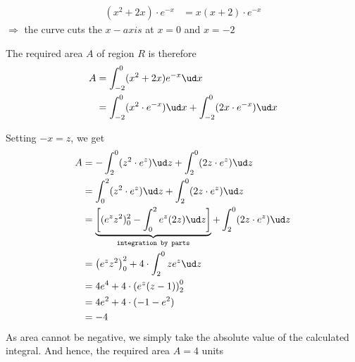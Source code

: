 \begin{solution}[\fullpage]
 \begin{align}
    (x^2+2x)\cdot e^{-x} &= x(x+2)\cdot e^{-x}
 \end{align}
 $\Rightarrow$ the curve cuts the $x-axis$ at $x=0$ and $x=-2$
 
 The required area $A$ of region $R$ is therefore
 \begin{align}
    A &= \int_{-2}^0(x^2+2x)e^{-x}\ud x \\
      &= \int_{-2}^0 (x^2\cdot e^{-x})\ud x + \int_{-2}^0 (2x\cdot e^{-x})\ud x
  \end{align}
  
  Setting $-x = z$, we get 
  \begin{align}
    A &= -\int_2^0(z^2\cdot e^z)\ud z + \int_2^0 (2z\cdot e^z)\ud z \\
      &= \int_0^2(z^2\cdot e^z)\ud z + \int_2^0 (2z\cdot e^z)\ud z \\
      &= \underbrace{\left[ (e^{z}z^2)_0^2 - \int_0^2 e^{z}(2z)\ud z \right]}_{\texttt{integration by parts}}
      + \int_2^0 (2z\cdot e^z)\ud z \\
      &= \left( e^{z}z^2 \right)_0^2 + 4\cdot\int_2^0 ze^{z}\ud z \\
      &= 4e^4 + 4\cdot\left( e^{z}(z-1)\right)_2^0 \\
      &= 4e^2 + 4\cdot(-1-e^2) \\
      &= -4
 \end{align}
 As area cannot be negative, we simply take the absolute value of the calculated integral.
 And hence, the required area $A = 4$ units
\end{solution}

